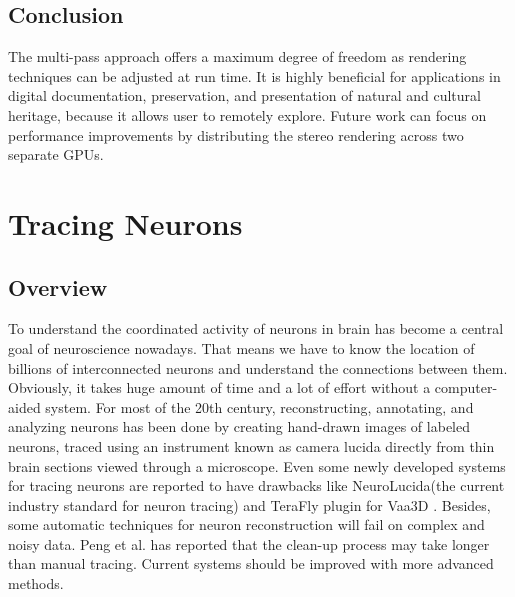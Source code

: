\documentclass[10pt,twocolumn,letterpaper]{article}
\begin{document}
\subsection{Conclusion}
The multi-pass approach offers a maximum degree of freedom as rendering techniques can be adjusted at run time. It is highly beneficial for applications in digital documentation, preservation, and presentation of natural and cultural heritage, because it allows user to remotely explore. Future work can focus on performance improvements by distributing the stereo rendering across two separate GPUs.

\section{Tracing Neurons}
\subsection{Overview}
To understand the coordinated activity of neurons in brain has become a central goal of neuroscience nowadays. That means we have to know the location of billions of interconnected neurons and understand the connections between them. Obviously, it takes huge amount of time and a lot of effort without a computer-aided system. For most of the 20th century, reconstructing, annotating, and analyzing neurons has been done by creating hand-drawn images of labeled neurons, traced using an instrument known as camera lucida directly from thin brain sections viewed through a microscope\cite{Usher2018}. Even some newly developed systems for tracing neurons are reported to have drawbacks like NeuroLucida(the current industry standard for neuron tracing) \cite{lucida2018} and TeraFly plugin for Vaa3D \cite{v3d}. Besides, some automatic techniques for neuron reconstruction will fail on complex and noisy data. Peng et al.\cite{Peng2011} has reported that the clean-up process may take longer than manual tracing. Current systems should be improved with more advanced methods.
\end{document}
